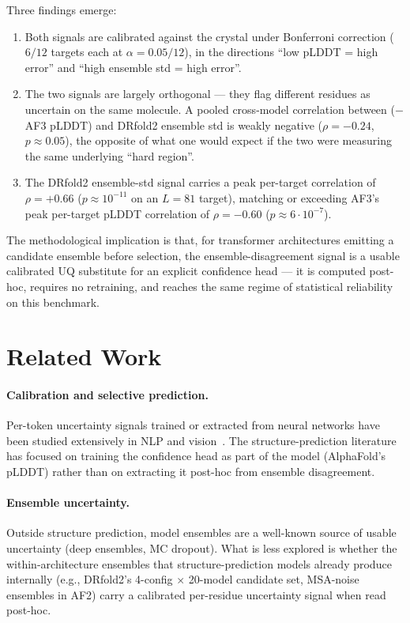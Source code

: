 \documentclass[conference,10pt]{IEEEtran}
\begin{document}
Three findings emerge:

\begin{enumerate}
\item Both signals are calibrated against the crystal under
Bonferroni correction ($6/12$ targets each at $\alpha=0.05/12$),
in the directions ``low pLDDT = high error'' and ``high ensemble
std = high error''.
\item The two signals are largely orthogonal --- they flag different
residues as uncertain on the same molecule. A pooled cross-model
correlation between ($-$AF3 pLDDT) and DRfold2 ensemble std is
weakly negative ($\rho = -0.24$, $p \approx 0.05$), the opposite of
what one would expect if the two were measuring the same underlying
``hard region''.
\item The DRfold2 ensemble-std signal carries a peak per-target
correlation of $\rho = +0.66$ ($p \approx 10^{-11}$ on an
$L=81$ target), matching or exceeding AF3's peak per-target pLDDT
correlation of $\rho = -0.60$ ($p \approx 6 \cdot 10^{-7}$).
\end{enumerate}

The methodological implication is that, for transformer architectures
emitting a candidate ensemble before selection, the
ensemble-disagreement signal is a usable calibrated UQ substitute for
an explicit confidence head --- it is computed post-hoc, requires no
retraining, and reaches the same regime of statistical reliability on
this benchmark.

\section{Related Work}

\paragraph{Calibration and selective prediction.}
Per-token uncertainty signals trained or extracted from neural
networks have been studied extensively in NLP and
vision~\cite{elyaniv2010}. The structure-prediction literature has
focused on training the confidence head as part of the model
(AlphaFold's pLDDT) rather than on extracting it post-hoc from
ensemble disagreement.

\paragraph{Ensemble uncertainty.}
Outside structure prediction, model ensembles are a well-known source
of usable uncertainty (deep ensembles, MC dropout). What is less
explored is whether the within-architecture ensembles that
structure-prediction models already produce internally
(e.g., DRfold2's 4-config $\times$ 20-model candidate set, MSA-noise
ensembles in AF2) carry a calibrated per-residue uncertainty signal
when read post-hoc.
\end{document}
